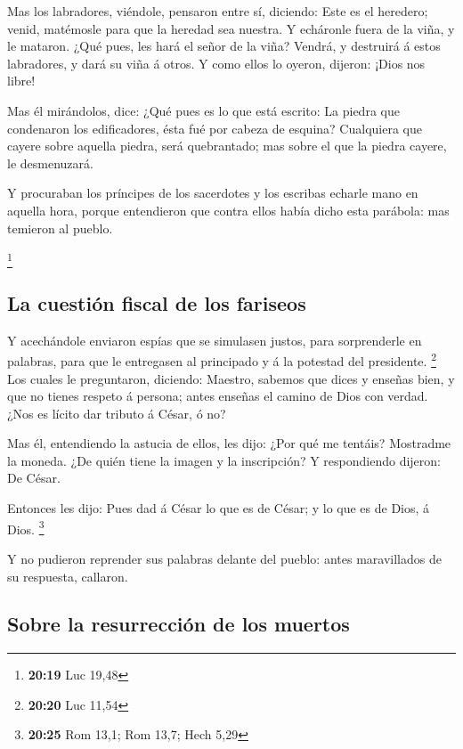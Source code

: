  Mas los labradores, viéndole, pensaron entre sí, diciendo:
Este es el heredero; venid, matémosle para que la heredad sea nuestra.
 Y echáronle fuera de la viña, y le mataron. ¿Qué pues, les
hará el señor de la viña?  Vendrá, y destruirá á estos
labradores, y dará su viña á otros. Y como ellos lo oyeron, dijeron:
¡Dios nos libre!

 Mas él mirándolos, dice: ¿Qué pues es lo que está escrito:
La piedra que condenaron los edificadores, ésta fué por cabeza de
esquina?  Cualquiera que cayere sobre aquella piedra, será
quebrantado; mas sobre el que la piedra cayere, le desmenuzará.

 Y procuraban los príncipes de los sacerdotes y los
escribas echarle mano en aquella hora, porque entendieron que contra
ellos había dicho esta parábola: mas temieron al pueblo.

\footnote{\textbf{20:19} Luc 19,48}

\hypertarget{la-cuestiuxf3n-fiscal-de-los-fariseos}{%
\subsection{La cuestión fiscal de los
fariseos}\label{la-cuestiuxf3n-fiscal-de-los-fariseos}}

 Y acechándole enviaron espías que se simulasen justos,
para sorprenderle en palabras, para que le entregasen al principado y á
la potestad del presidente. \footnote{\textbf{20:20} Luc 11,54}
 Los cuales le preguntaron, diciendo: Maestro, sabemos que
dices y enseñas bien, y que no tienes respeto á persona; antes enseñas
el camino de Dios con verdad.  ¿Nos es lícito dar tributo á
César, ó no?

 Mas él, entendiendo la astucia de ellos, les dijo: ¿Por
qué me tentáis?  Mostradme la moneda. ¿De quién tiene la
imagen y la inscripción? Y respondiendo dijeron: De César.

 Entonces les dijo: Pues dad á César lo que es de César; y
lo que es de Dios, á Dios. \footnote{\textbf{20:25} Rom 13,1; Rom 13,7;
  Hech 5,29}

 Y no pudieron reprender sus palabras delante del pueblo:
antes maravillados de su respuesta, callaron.

\hypertarget{sobre-la-resurrecciuxf3n-de-los-muertos}{%
\subsection{Sobre la resurrección de los
muertos}\label{sobre-la-resurrecciuxf3n-de-los-muertos}}

